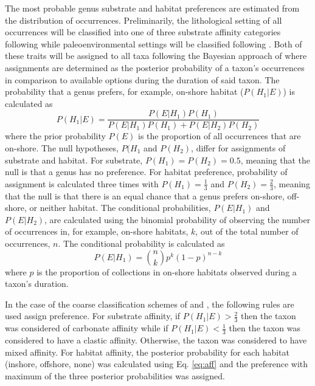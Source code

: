 \documentclass[12pt,letterpaper]{article}
\begin{document}
The most probable genus substrate and habitat preferences are estimated from the distribution of occurrences. Preliminarily, the lithological setting of all occurrences will be classified into one of three substrate affinity categories following \citet{Foote2006} while paleoenvironmental settings will be classified following \citet{Kiessling2007}. Both of these traits will be assigned to all taxa following the Bayesian approach of \citet{Simpson2009} where assignments are determined as the posterior probability of a taxon's occurrences in comparison to available options during the duration of said taxon. The probability that a genus prefers, for example, on-shore habitat (\(P(H_{1}|E)\)) is calculated as
\begin{equation}
  P(H_{1}|E) = \frac{P(E|H_{1})P(H_{1})}{P(E|H_{1})P(H_{1}) + P(E|H_{2})P(H_{2})}
  \label{eq:aff}
\end{equation}
where the prior probability \(P(E)\) is the proportion of all occurrences that are on-shore. The null hypotheses, \(P(H_{1}\) and \(P(H_{2})\), differ for assignments of substrate and habitat. For substrate, \(P(H_{1}) = P(H_{2}) = 0.5\), meaning that the null is that a genus has no preference. For habitat preference, probability of assignment is calculated three times with \(P(H_{1}) = \frac{1}{3}\) and \(P(H_{2}) = \frac{2}{3}\), meaning that the null is that there is an equal chance that a genus prefers on-shore, off-shore, or neither habitat. The conditional probabilities, \(P(E|H_{1})\) and \(P(E|H_{2})\), are calculated using the binomial probability of observing the number of occurrences in, for example, on-shore habitats, \(k\), out of the total number of occurrences, \(n\). The conditional probability is calculated as
\begin{equation}
  P(E|H_{1}) = \binom{n}{k} p^{k}(1 - p)^{n - k}
  \label{eq:condprob}
\end{equation}
where \(p\) is the proportion of collections in on-shore habitats observed during a taxon's duration.

In the case of the coarse classification schemes of \citet{Foote2006} and \citet{Kiessling2007}, the following rules are used assign preference. For substrate affinity, if \(P(H_{1}|E) > \frac{2}{3}\) then the taxon was considered of carbonate affinity while if \(P(H_{1}|E) < \frac{1}{3}\) then the taxon was considered to have a clastic affinity. Otherwise, the taxon was considered to have mixed affinity. For habitat affinity, the posterior probability for each habitat (inshore, offshore, none) was calculated using Eq. \ref{eq:aff} and the preference with maximum of the three posterior probabilities was assigned.
\end{document}
